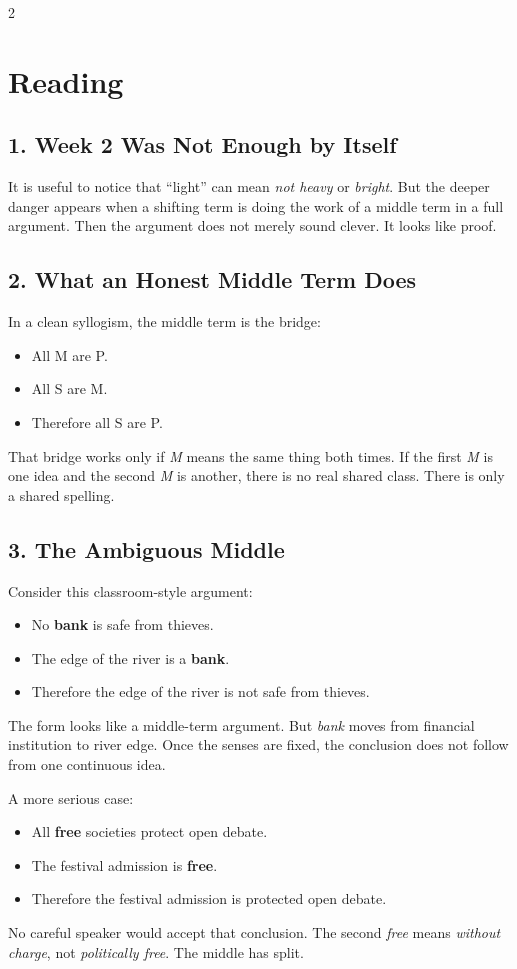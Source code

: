 \documentclass[12pt]{article}
\begin{document}
\begin{multicols}{2}
\section*{Reading}

\subsection*{1. Week 2 Was Not Enough by Itself}
It is useful to notice that ``light'' can mean \textit{not heavy} or \textit{bright}. But the deeper danger appears when a shifting term is doing the work of a middle term in a full argument. Then the argument does not merely sound clever. It looks like proof.

\subsection*{2. What an Honest Middle Term Does}
In a clean syllogism, the middle term is the bridge:
\begin{itemize}[leftmargin=*]
\item All M are P.
\item All S are M.
\item Therefore all S are P.
\end{itemize}
That bridge works only if \textit{M} means the same thing both times. If the first \textit{M} is one idea and the second \textit{M} is another, there is no real shared class. There is only a shared spelling.

\subsection*{3. The Ambiguous Middle}
Consider this classroom-style argument:
\begin{itemize}[leftmargin=*]
\item No \textbf{bank} is safe from thieves.
\item The edge of the river is a \textbf{bank}.
\item Therefore the edge of the river is not safe from thieves.
\end{itemize}
The form looks like a middle-term argument. But \textit{bank} moves from financial institution to river edge. Once the senses are fixed, the conclusion does not follow from one continuous idea.

A more serious case:
\begin{itemize}[leftmargin=*]
\item All \textbf{free} societies protect open debate.
\item The festival admission is \textbf{free}.
\item Therefore the festival admission is protected open debate.
\end{itemize}
No careful speaker would accept that conclusion. The second \textit{free} means \textit{without charge}, not \textit{politically free}. The middle has split.


\end{multicols}
\end{document}
